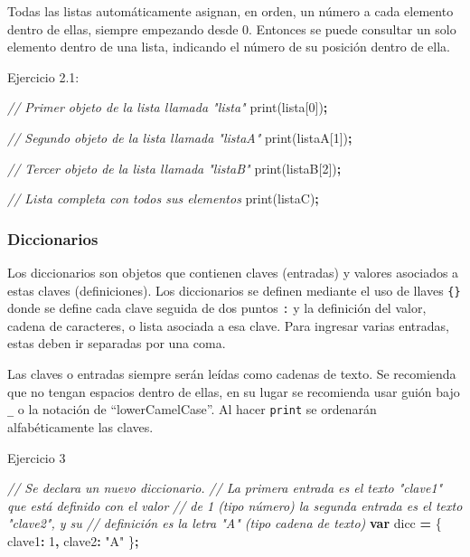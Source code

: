 \documentclass[
  12pt,
  letterpaper,
  twoside]{book}
\newenvironment{Shaded}{\begin{snugshade}}{\end{snugshade}}
\newcommand{\CommentTok}[1]{\textcolor[rgb]{0.56,0.35,0.01}{\textit{#1}}}
\newcommand{\DataTypeTok}[1]{\textcolor[rgb]{0.13,0.29,0.53}{#1}}
\newcommand{\DecValTok}[1]{\textcolor[rgb]{0.00,0.00,0.81}{#1}}
\newcommand{\FunctionTok}[1]{\textcolor[rgb]{0.00,0.00,0.00}{#1}}
\newcommand{\KeywordTok}[1]{\textcolor[rgb]{0.13,0.29,0.53}{\textbf{#1}}}
\newcommand{\NormalTok}[1]{#1}
\newcommand{\OperatorTok}[1]{\textcolor[rgb]{0.81,0.36,0.00}{\textbf{#1}}}
\newcommand{\StringTok}[1]{\textcolor[rgb]{0.31,0.60,0.02}{#1}}
\begin{document}
Todas las listas automáticamente asignan, en orden, un número a cada elemento dentro de ellas, siempre empezando desde 0. Entonces se puede consultar un solo elemento dentro de una lista, indicando el número de su posición dentro de ella.

Ejercicio 2.1:

\begin{Shaded}
\begin{Highlighting}[]
\CommentTok{// Primer objeto de la lista llamada "lista"}
\FunctionTok{print}\NormalTok{(lista[}\DecValTok{0}\NormalTok{])}\OperatorTok{;} 

\CommentTok{// Segundo objeto de la lista llamada "listaA"}
\FunctionTok{print}\NormalTok{(listaA[}\DecValTok{1}\NormalTok{])}\OperatorTok{;}

\CommentTok{// Tercer objeto de la lista llamada "listaB"}
\FunctionTok{print}\NormalTok{(listaB[}\DecValTok{2}\NormalTok{])}\OperatorTok{;}

\CommentTok{// Lista completa con todos sus elementos}
\FunctionTok{print}\NormalTok{(listaC)}\OperatorTok{;}    
\end{Highlighting}
\end{Shaded}

\hypertarget{diccionarios}{%
\subsubsection*{Diccionarios}\label{diccionarios}}

Los diccionarios son objetos que contienen claves (entradas) y valores asociados a estas claves (definiciones). Los diccionarios se definen mediante el uso de llaves \texttt{\{\}} donde se define cada clave seguida de dos puntos \texttt{:} y la definición del valor, cadena de caracteres, o lista asociada a esa clave. Para ingresar varias entradas, estas deben ir separadas por una coma.

Las claves o entradas siempre serán leídas como cadenas de texto. Se recomienda que no tengan espacios dentro de ellas, en su lugar se recomienda usar guión bajo \texttt{\_} o la notación de ``lowerCamelCase''. Al hacer \texttt{print} se ordenarán alfabéticamente las claves.

Ejercicio 3

\begin{Shaded}
\begin{Highlighting}[]
\CommentTok{// Se declara un nuevo diccionario.}
\CommentTok{// La primera entrada es el texto "clave1" que está definido con el valor}
\CommentTok{// de 1 (tipo número) la segunda entrada es el texto "clave2", y su }
\CommentTok{// definición es la letra "A" (tipo cadena de texto)}
\KeywordTok{var}\NormalTok{ dicc }\OperatorTok{=}\NormalTok{ \{   }
  \DataTypeTok{clave1}\OperatorTok{:} \DecValTok{1}\OperatorTok{,}      
  \DataTypeTok{clave2}\OperatorTok{:} \StringTok{"A"}  
\NormalTok{\}}\OperatorTok{;}            
      
\end{Highlighting}
\end{Shaded}
\end{document}
